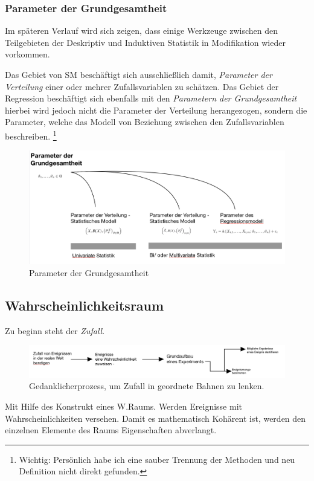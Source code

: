\subsubsection{Parameter der Grundgesamtheit}
Im späteren Verlauf wird sich zeigen, dass einige Werkzeuge zwischen den Teilgebieten der Deskriptiv und Induktiven Statistik in Modifikation wieder vorkommen. 

Das Gebiet von \gls{SM} beschäftigt sich ausschließlich damit, \textit{Parameter der Verteilung} einer oder mehrer Zufallsvariablen zu schätzen. Das Gebiet der Regression beschäftigt sich ebenfalls mit den \textit{Parametern der Grundgesamtheit} hierbei wird jedoch nicht die Parameter der Verteilung herangezogen, sondern die Parameter, welche das Modell von Beziehung zwischen den Zufallsvariablen beschreiben. \footnote{Wichtig: Persönlich habe ich eine sauber Trennung der Methoden und neu Definition nicht direkt gefunden.}

\begin{figure}[H]
	\centering
	\includegraphics[width=0.7\linewidth]{attachment/chapter_13/Scc071}
	\caption{Parameter der Grundgesamtheit} 
\end{figure}

\subsection{Wahrscheinlichkeitsraum}
Zu beginn steht der \textit{Zufall}.\\

\begin{figure}[H]
	\centering
	\includegraphics[width=0.7\linewidth]{attachment/chapter_13/Scc066}
	\caption{Gedanklicherprozess, um Zufall in geordnete Bahnen zu lenken.}
\end{figure}

Mit Hilfe des Konstrukt eines \gls{W.}Raums. Werden Ereignisse mit Wahrscheinlichkeiten versehen. Damit es mathematisch Kohärent ist, werden den einzelnen Elemente des Raums Eigenschaften abverlangt.

